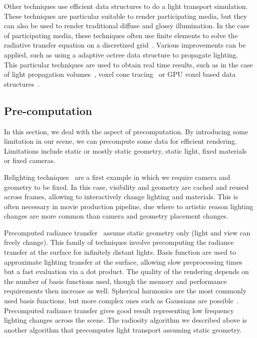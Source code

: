 Other techniques use efficient data structures to do a light transport simulation. These techniques are particular suitable to render participating media, but they can also be used to render traditional diffuse and glossy illumination. In the case of participating media, these techniques often use finite elements to solve the radiative transfer equation on a discretized grid~\cite{Fattal2009}. Various improvements can be applied, such as using a adaptive octree data structure to propagate lighting. This particular techniques are used to obtain real time results, such as in the case of light propagation volumes~\cite{Kaplanyan2009,Borlum2011}, voxel cone tracing~\cite{Crassin2011} or GPU voxel based data structures~\cite{Hoetzlein2016}. 

\subsection{Pre-computation}
In this section, we deal with the aspect of precomputation. By introducing some limitation in our scene, we can precompute some data for efficient rendering. Limitations include static or mostly static geometry, static light, fixed materials or fixed cameras. 

Relighting techniques~\cite{Nimeroff94, Pellacini2005, Hasan2006} are a first example in which we require camera and geometry to be fixed. In this case, visibility and geometry are cached and reused across frames, allowing to interactively change lighting and materials. This is often necessary in movie production pipeline, due where to artistic reason lighting changes are more common than camera and geometry placement changes.

Precomputed radiance transfer~\cite{Sloan2002} assume static geometry only (light and view can freely change). This family of techniques involve precomputing the radiance transfer at the surface for infinitely distant lights. Basis function are used to approximate lighting transfer at the surface, allowing slow preprocessing times but a fast evaluation via a dot product. The quality of the rendering depends on the number of basis functions used, though the memory and performance requirements then increase as well. Spherical harmonics are the most commonly used basis functions, but more complex ones such as Gaussians are possible~\cite{Green2006}. Precomputed radiance transfer gives good result representing low frequency lighting changes across the scene. The radiosity algorithm we described above is another algorithm that precomputes light transport assuming static geometry.

